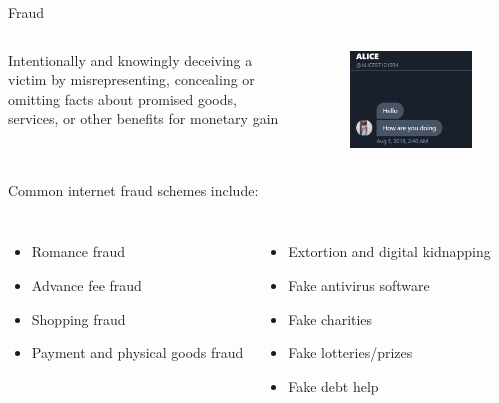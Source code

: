 \documentclass[nobackground,dvipsnames,table,aspectratio=169]{beamer}
\begin{document}
\begin{frame}{Fraud}
    \begin{columns}
            Intentionally and knowingly deceiving a victim by misrepresenting, concealing or omitting facts about promised goods, services, or other benefits for monetary gain
            \begin{figure}
                \centering
                \includegraphics[width=\textwidth]{ALICE}
            \end{figure}
    \end{columns}
    Common internet fraud schemes include:
    \begin{columns}
            \begin{itemize}
                \item Romance fraud
                \item Advance fee fraud
                \item Shopping fraud
                \item Payment and physical goods fraud
            \end{itemize}
            \begin{itemize}
                \item Extortion and digital kidnapping
                \item Fake antivirus software
                \item Fake charities
                \item Fake lotteries/prizes
                \item Fake debt help
            \end{itemize}
    \end{columns}
\end{frame}
\end{document}
